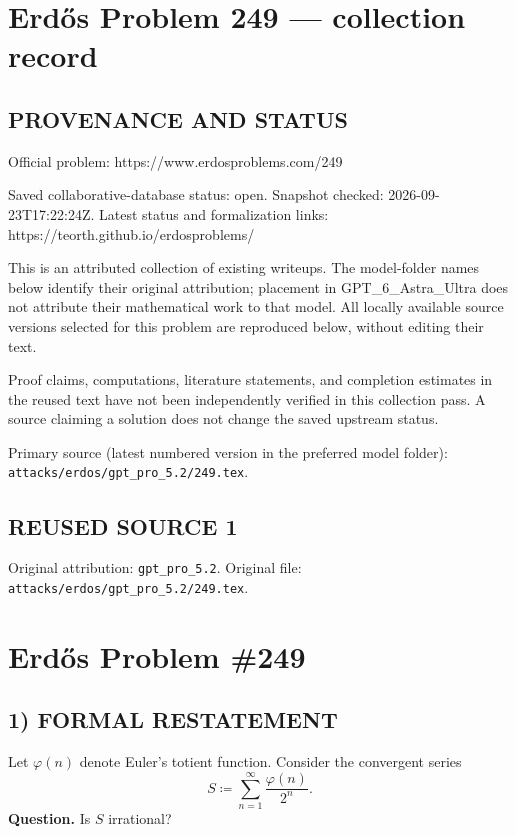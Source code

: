 \section*{Erd\H{o}s Problem 249 --- collection record}

\subsection*{PROVENANCE AND STATUS}
Official problem: https://www.erdosproblems.com/249

Saved collaborative-database status: open.
Snapshot checked: 2026-09-23T17:22:24Z.
Latest status and formalization links: https://teorth.github.io/erdosproblems/

This is an attributed collection of existing writeups. The model-folder names below identify their original attribution; placement in GPT\_6\_Astra\_Ultra does not attribute their mathematical work to that model. All locally available source versions selected for this problem are reproduced below, without editing their text.

Proof claims, computations, literature statements, and completion estimates in the reused text have not been independently verified in this collection pass. A source claiming a solution does not change the saved upstream status.

Primary source (latest numbered version in the preferred model folder): \texttt{attacks/erdos/gpt\_pro\_5.2/249.tex}.

\subsection*{REUSED SOURCE 1}
Original attribution: \texttt{gpt\_pro\_5.2}.
Original file: \texttt{attacks/erdos/gpt\_pro\_5.2/249.tex}.

\section*{Erd\H{o}s Problem \#249}

\subsection*{1) FORMAL RESTATEMENT}
Let $\varphi(n)$ denote Euler's totient function. Consider the convergent series
\[
S \coloneqq \sum_{n=1}^{\infty}\frac{\varphi(n)}{2^n}.
\]
\noindent\textbf{Question.} Is $S$ irrational?

